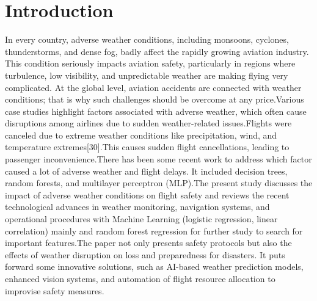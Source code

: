 \documentclass[conference]{IEEEtran}
\begin{document}
\section{Introduction}
In every country, adverse weather conditions, including monsoons, cyclones, thunderstorms, and dense fog, badly affect the rapidly growing aviation industry. This condition seriously impacts  aviation safety, particularly in regions where turbulence, low visibility, and unpredictable weather are making flying very complicated. At the global level,  aviation accidents are connected with weather conditions; that is why such challenges should be overcome at any price.Various case studies highlight factors associated with adverse weather, which often cause disruptions among airlines due to sudden weather-related issues.Flights were canceled due to extreme weather conditions like precipitation, wind, and temperature extremes[30].This causes sudden flight cancellations, leading to passenger inconvenience.There has been some recent work to address which factor caused a lot of adverse weather and flight delays. It included decision trees, random forests, and multilayer perceptron  (MLP).The present study discusses the impact of adverse weather conditions on flight safety  and reviews the recent technological advances in weather monitoring, navigation systems, and operational procedures with Machine Learning (logistic regression, linear correlation) mainly and random forest regression for further study to search for important features.The paper not only presents safety protocols but also the effects of weather disruption on loss and preparedness for disasters. It puts forward some innovative solutions, such as AI-based weather prediction models, enhanced vision systems, and automation of flight resource allocation to improvise safety measures.
\end{document}
